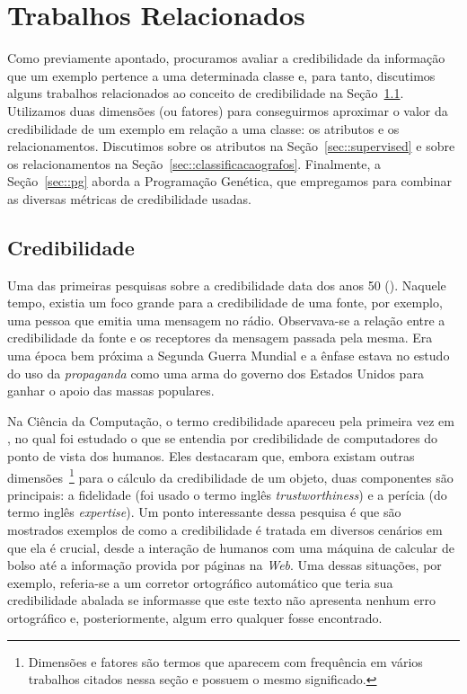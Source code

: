 
\chapter{Trabalhos Relacionados}
\label{cap::related}

Como previamente apontado, procuramos avaliar a credibilidade da informação que um exemplo pertence a uma determinada classe e, para tanto, discutimos alguns trabalhos relacionados ao conceito de credibilidade na Seção~\ref{sec::credibilidade}. 
Utilizamos duas dimensões (ou fatores) para conseguirmos aproximar o valor da credibilidade de um exemplo em relação a uma classe: os atributos e os relacionamentos.
Discutimos sobre os atributos na Seção~\ref{sec::supervised} e sobre os relacionamentos na Seção~\ref{sec::classificacaografos}.
Finalmente, a Seção~\ref{sec::pg} aborda a Programação Genética, que empregamos para combinar as diversas métricas de credibilidade usadas. 


\section{Credibilidade}
\label{sec::credibilidade}

Uma das primeiras pesquisas sobre a credibilidade data dos anos 50 (\cite{Hovland51}). Naquele tempo, existia um foco grande para a credibilidade de uma fonte, por exemplo, uma pessoa que emitia uma mensagem no rádio. Observava-se a relação entre a credibilidade da fonte e os receptores da mensagem passada pela mesma. Era uma época bem próxima a Segunda Guerra Mundial e a ênfase estava no estudo do uso da \textit{propaganda} como uma arma do governo dos Estados Unidos para ganhar o apoio das massas populares.

Na Ciência da Computação, o termo credibilidade apareceu pela primeira vez em \cite{Tseng99}, no qual foi estudado o 
que se entendia por credibilidade de computadores do ponto de vista dos humanos.
Eles destacaram que, embora existam outras dimensões~\footnote{Dimensões e fatores são termos que aparecem com frequência em vários trabalhos citados nessa seção e possuem o mesmo significado.} para o cálculo da credibilidade de um objeto, duas componentes são principais: a fidelidade (foi usado o termo inglês \textit{trustworthiness}) e a perícia (do termo inglês \textit{expertise}).
Um ponto interessante dessa pesquisa é que são mostrados exemplos de como a credibilidade é tratada em diversos cenários em que ela é crucial, desde a interação de humanos com uma máquina de calcular de bolso até a informação provida por páginas na \textit{Web}.
Uma dessas situações, por exemplo, referia-se a um corretor ortográfico automático que teria sua credibilidade abalada se informasse que este texto não apresenta nenhum erro ortográfico e, posteriormente, algum erro qualquer fosse encontrado.

